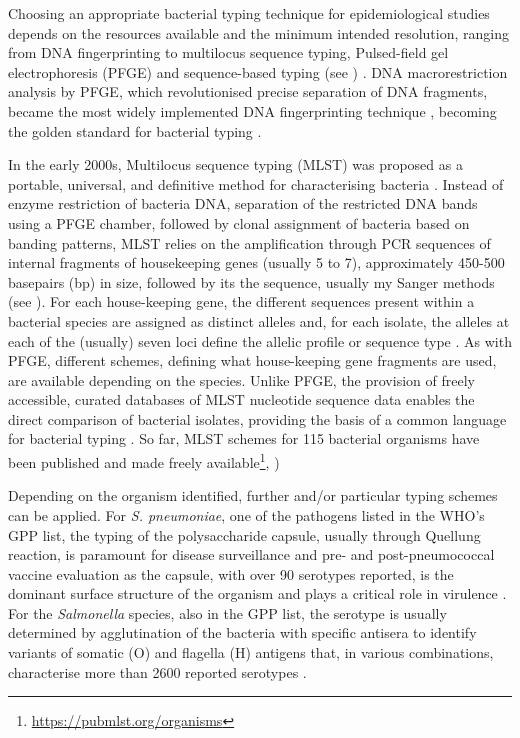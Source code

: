 Choosing an appropriate bacterial typing technique for epidemiological studies depends on the resources available and the minimum intended resolution, ranging from DNA fingerprinting to multilocus sequence typing, Pulsed-field gel electrophoresis (PFGE) and sequence-based typing (see ) \citep{allerberger_molecular_2012,foxman_choosing_2005}. 
DNA macrorestriction analysis by PFGE, which revolutionised precise separation of DNA fragments, became the most widely implemented DNA fingerprinting technique \citep{allerberger_molecular_2012}, becoming the golden standard for bacterial typing \citep{neoh_pulsed-field_2019}.

In the early 2000s, Multilocus sequence typing (MLST) was proposed as a portable, universal, and definitive method for characterising bacteria \citep{maiden_multilocus_2006}. 
Instead of enzyme restriction of bacteria DNA, separation of the restricted DNA bands using a PFGE chamber, followed by clonal assignment of bacteria based on banding patterns, MLST relies on the amplification through PCR sequences of internal fragments of housekeeping genes (usually 5 to 7), approximately 450-500 basepairs (bp) in size, followed by its the sequence, usually my Sanger methods (see ). 
For each house-keeping gene, the different sequences present within a bacterial species are assigned as distinct alleles and, for each isolate, the alleles at each of the (usually) seven loci define the allelic profile or sequence type \citep{larsen_multilocus_2012}. 
As with PFGE, different schemes, defining what house-keeping gene fragments are used, are available depending on the species. 
Unlike PFGE, the provision of freely accessible, curated databases of MLST nucleotide sequence data enables the direct comparison of bacterial isolates, providing the basis of a common language for bacterial typing \citep{maiden_multilocus_2006}. 
So far, MLST schemes for 115 bacterial organisms have been published and made freely available\footnote{\url{https://pubmlst.org/organisms}}, \cite{jolley_open-access_2018}) 

Depending on the organism identified, further and/or particular typing schemes can be applied. 
For \textit{S. pneumoniae}, one of the pathogens listed in the WHO's GPP list, the typing of the polysaccharide capsule, usually through Quellung reaction, is paramount for disease surveillance and pre- and post-pneumococcal vaccine evaluation as the capsule, with over 90 serotypes reported, is the dominant surface structure of the organism and plays a critical role in virulence \citep{jauneikaite_current_2015, paton_streptococcus_2019}. 
For the \textit{Salmonella} species, also in the GPP list, the serotype is usually determined by agglutination of the bacteria with specific antisera to identify variants of somatic (O) and flagella (H) antigens that, in various combinations, characterise more than 2600 reported serotypes \citep{diep_salmonella_2019}. 

